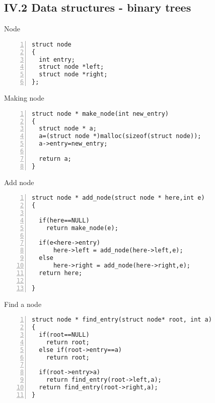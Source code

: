 \documentclass{beamer}
\begin{document}
\subsection*{IV.2 Data structures - binary trees}
\begin{frame}[fragile]{Node}
\begin{lstlisting}[numbers=left]
struct node
{
  int entry;
  struct node *left;
  struct node *right;
};
\end{lstlisting}
\end{frame}
\begin{frame}[fragile]{Making node}
\begin{lstlisting}[numbers=left]
struct node * make_node(int new_entry)
{
  struct node * a;
  a=(struct node *)malloc(sizeof(struct node));
  a->entry=new_entry;

  return a;
}
\end{lstlisting}
\end{frame}
\begin{frame}[fragile]{Add node}
\begin{lstlisting}[numbers=left]
struct node * add_node(struct node * here,int e)
{

  if(here==NULL)
    return make_node(e);

  if(e<here->entry)
      here->left = add_node(here->left,e);
  else
      here->right = add_node(here->right,e);
  return here;

}
\end{lstlisting}
\end{frame}
\begin{frame}[fragile]{Find a node}
\begin{lstlisting}[numbers=left]
struct node * find_entry(struct node* root, int a)
{
  if(root==NULL)
    return root;
  else if(root->entry==a)
    return root;

  if(root->entry>a)
    return find_entry(root->left,a);
  return find_entry(root->right,a);
}
\end{lstlisting}
\end{frame}
\end{document}
